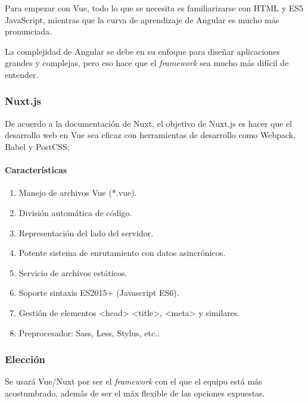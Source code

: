 Para empezar con Vue, todo lo que se necesita es familiarizarse con HTML y ES5 JavaScript, mientras que la curva de aprendizaje de Angular es mucho más pronunciada. 


La complejidad de Angular se debe en su enfoque para diseñar aplicaciones grandes y complejas, pero eso hace que el \textit{framework} sea mucho más difícil de entender.



\subsubsection*{Nuxt.js}
De acuerdo a la documentación de Nuxt\cite{noauthor_what_nodate-1}, el objetivo de Nuxt.js es hacer que el desarrollo web en Vue sea eficaz con herramientas de desarrollo como Webpack, Babel y PostCSS; 

\paragraph*{Características}
\begin{enumerate}
    \item Manejo de archivos Vue (*.vue).
    \item División automática de código.
    \item Representación del lado del servidor.
    \item Potente sistema de enrutamiento con datos asincrónicos.
    \item Servicio de archivos estáticos.
    \item Soporte sintaxis ES2015+ (Javascript ES6).
    \item Gestión de elementos <head> <title>, <meta> y similares.
    \item Preprocesador: Sass, Less, Stylus, etc..
\end{enumerate}



\subsubsection*{Elección}

Se usará Vue/Nuxt por ser el \textit{framework} con el que el equipo está más acostumbrado, además de ser el máx flexible de las opciones expuestas.